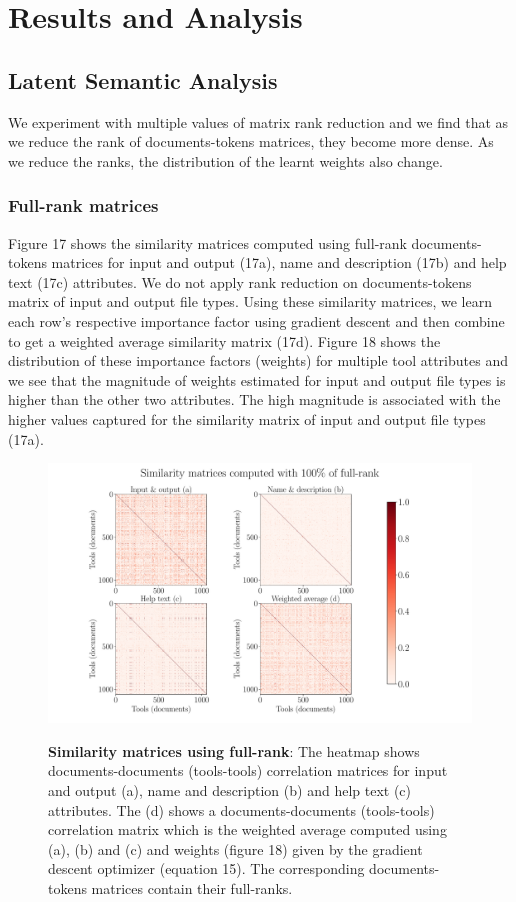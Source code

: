 \chapter{Results and Analysis}
\section{Latent Semantic Analysis}
We experiment with multiple values of matrix rank reduction and we find that as we reduce the rank of documents-tokens matrices, they become more dense. As we reduce the ranks, the distribution of  the learnt weights also change. 

\subsection{Full-rank matrices}
Figure 17 shows the similarity matrices computed using full-rank documents-tokens matrices for input and output (17a), name and description (17b) and help text (17c) attributes. We do not apply rank reduction on documents-tokens matrix of input and output file types. Using these similarity matrices, we learn each row's respective importance factor using gradient descent and then combine to get a weighted average similarity matrix (17d). Figure 18 shows the distribution of these importance factors (weights) for multiple tool attributes and we see that the magnitude of weights estimated for input and output file types is higher than the other two attributes. The high magnitude is associated with the higher values captured for the similarity matrix of input and output file types (17a). 

\begin{figure}[h]
\begin{centering}
    {\includegraphics[scale=0.35]{figures/Similarity_matrices_100.pdf}}
    \caption[Similarity matrices full rank]{\textbf{Similarity matrices using full-rank}: The heatmap shows documents-documents (tools-tools) correlation matrices for input and output (a), name and description (b) and help text (c) attributes. The (d) shows a documents-documents (tools-tools) correlation matrix which is the weighted average computed using (a), (b) and (c) and weights (figure 18) given by the gradient descent optimizer (equation 15). The corresponding documents-tokens matrices contain their full-ranks. }
\end{centering}
\end{figure}

